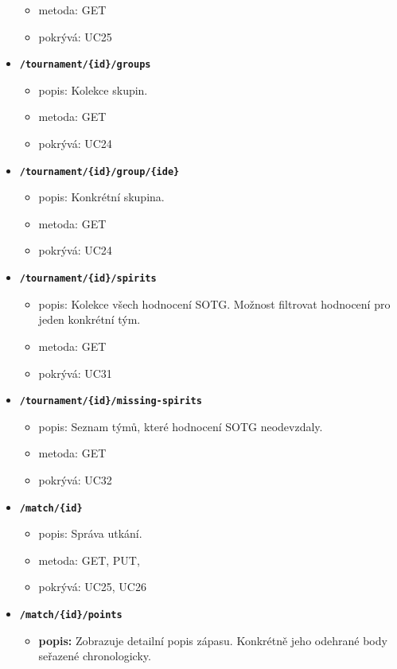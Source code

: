 \begin{itemize}
\begin{itemize}
    \item metoda: GET
    \item pokrývá: UC25
  \end{itemize}
  \item \texttt{\textbf{/tournament/\{id\}/groups}}
  \begin{itemize}
    \item popis: Kolekce skupin.
    \item metoda: GET
    \item pokrývá: UC24
  \end{itemize}
  \item \texttt{\textbf{/tournament/\{id\}/group/\{ide\}}}
  \begin{itemize}
    \item popis: Konkrétní skupina.
    \item metoda: GET
    \item pokrývá: UC24
  \end{itemize}
  \item \texttt{\textbf{/tournament/\{id\}/spirits}}
  \begin{itemize}
    \item popis: Kolekce všech hodnocení SOTG. Možnost filtrovat hodnocení pro jeden konkrétní tým.
    \item metoda: GET
    \item pokrývá: UC31
  \end{itemize}
  \item \texttt{\textbf{/tournament/\{id\}/missing-spirits}}
  \begin{itemize}
    \item popis: Seznam týmů, které hodnocení SOTG neodevzdaly.
    \item metoda: GET
    \item pokrývá: UC32
  \end{itemize}
  \item \texttt{\textbf{/match/\{id\}}}
  \begin{itemize}
    \item popis: Správa utkání.
    \item metoda: GET, PUT, 
    \item pokrývá: UC25, UC26
  \end{itemize}
  \item \texttt{\textbf{/match/\{id\}/points}}
  \begin{itemize}
    \item \textbf{popis:} Zobrazuje detailní popis zápasu. Konkrétně jeho odehrané body seřazené chronologicky.

\end{itemize}
\end{itemize}
